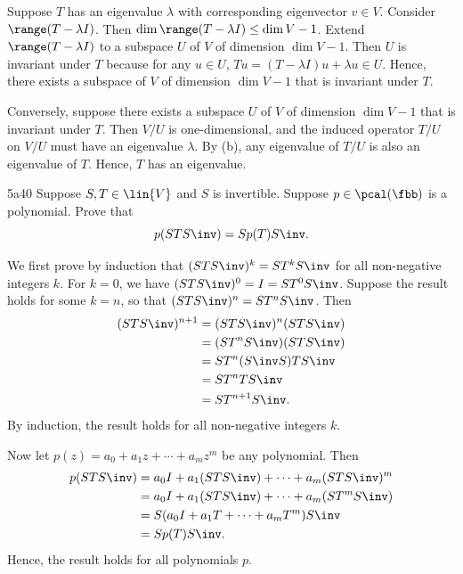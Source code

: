 \begin{sol}
    Suppose $T$ has an eigenvalue $\lambda$ with corresponding eigenvector $v \in V$.
	Consider $\range(T - \lambda I)$.
	Then $\dim \range(T - \lambda I) \leq \dim V - 1$.
	Extend $\range(T - \lambda I)$ to a subspace $U$ of $V$ of dimension $\dim V - 1$.
	Then $U$ is invariant under $T$ because for any $u \in U$, $Tu = (T - \lambda I)u + \lambda u \in U$.
	Hence, there exists a subspace of $V$ of dimension $\dim V - 1$ that is invariant under $T$.

    Conversely, suppose there exists a subspace $U$ of $V$ of dimension $\dim V - 1$ that is invariant under $T$.
	Then $V / U$ is one-dimensional, and the induced operator $T / U$ on $V / U$ must have an eigenvalue $\lambda$.
	By  (b), any eigenvalue of $T / U$ is also an eigenvalue of $T$.
	Hence, $T$ has an eigenvalue.
\end{sol}

\begin{exercise}{5a40}
    Suppose $S, T \in \lin{V}$ and $S$ is invertible.
	Suppose $p \in \pcal(\fbb)$ is a polynomial.
	Prove that
    \[
    	p(STS\inv) = Sp(T)S\inv.
    \]
\end{exercise}

\begin{sol}
    We first prove by induction that $(STS\inv)^k = ST^kS\inv$ for all non-negative integers $k$.
	For $k = 0$, we have $(STS\inv)^0 = I = ST^0S\inv$.
	Suppose the result holds for some $k = n$, so that $(STS\inv)^n = ST^nS\inv$.
	Then
    \begin{align*}
        (STS\inv)^{n+1} &= (STS\inv)^n (STS\inv) \\
        &= (ST^nS\inv)(STS\inv) \\
        &= S T^n (S\inv S) T S\inv \\
        &= S T^n T S\inv \\
        &= S T^{n+1} S\inv.
    \end{align*}
    By induction, the result holds for all non-negative integers $k$.

    Now let $p(z) = a_0 + a_1 z + \cdots + a_m z^m$ be any polynomial.
	Then
    \begin{align*}
        p(STS\inv) &= a_0 I + a_1 (STS\inv) + \cdots + a_m (STS\inv)^m \\
        &= a_0 I + a_1 (STS\inv) + \cdots + a_m (ST^mS\inv) \\
        &= S(a_0 I + a_1 T + \cdots + a_m T^m)S\inv \\
        &= Sp(T)S\inv.
    \end{align*}
    Hence, the result holds for all polynomials $p$.
\end{sol}

